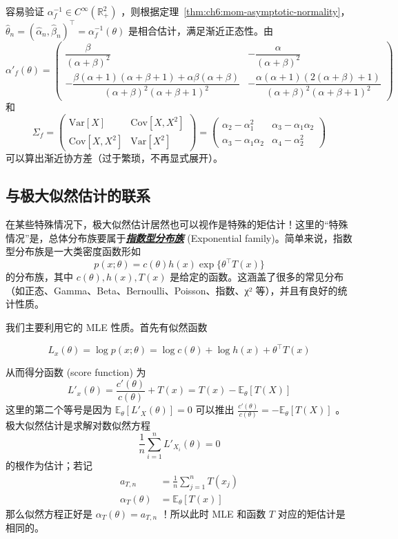 \begin{remark}
\begin{example}
容易验证 $\alpha_f^{-1}\in C^\infty(\mathbb R_+^2)$ ，则根据定理~\ref{thm:ch6:mom-asymptotic-normality}， $\widehat\theta_n=(\widehat\alpha_n,\widehat\beta_n)^\top=\alpha_f^{-1}(\theta)$ 是相合估计，满足渐近正态性。由\[\alpha'_f(\theta)=\begin{pmatrix} \dfrac{\beta}{(\alpha+\beta)^2} & -\dfrac{\alpha}{(\alpha+\beta)^2} \\ -\dfrac{\beta(\alpha+1)(\alpha+\beta+1) + \alpha\beta (\alpha+\beta)}{(\alpha+\beta)^2(\alpha+\beta+1)^2} & -\dfrac{\alpha(\alpha+1)(2(\alpha+\beta)+1)}{(\alpha+\beta)^2(\alpha+\beta+1)^2} \end{pmatrix}\]和\[\Sigma_f = \begin{pmatrix} \mathrm{Var}[X] & \mathrm{Cov}[X, X^2] \\ \mathrm{Cov}[X, X^2] & \mathrm{Var}[X^2] \end{pmatrix}= \begin{pmatrix} \alpha_2 - \alpha_1^2 & \alpha_3 - \alpha_1\alpha_2 \\ \alpha_3 - \alpha_1\alpha_2 & \alpha_4 - \alpha_2^2 \end{pmatrix}\]
可以算出渐近协方差（过于繁琐，不再显式展开）。


\end{example}

\subsection{与极大似然估计的联系}

在某些特殊情况下，极大似然估计居然也可以视作是特殊的矩估计！这里的``特殊情况''是，总体分布族要属于\textbf{\emph{\href{https://en.wikipedia.org/wiki/Exponential_family}{指数型分布族}}} (Exponential family)。简单来说，指数型分布族是一大类密度函数形如
\[
p(x;\theta)=c(\theta)h(x)\exp\{\theta^\top T(x)\}
\]
的分布族，其中 $c(\theta),h(x),T(x)$ 是给定的函数。这涵盖了很多的常见分布（如正态、Gamma、Beta、Bernoulli、Poisson、指数、χ² 等），并且有良好的统计性质。%



我们主要利用它的 MLE 性质。首先有似然函数 

$$L_x(\theta)=\log p(x;\theta)=\log c(\theta)+\log h(x)+\theta^\top T(x)$$

从而得分函数 (score function) 为 \[ L'_x(\theta)=\frac{c'(\theta)}{c(\theta)}+T(x)=T(x)-\mathbb{E}_\theta[T(X)] \]这里的第二个等号是因为 $\mathbb{E}_\theta[L'_X(\theta)]=0$ 可以推出 $\frac{c'(\theta)}{c(\theta)}=-\mathbb{E}_\theta[T(X)]$ 。极大似然估计是求解对数似然方程 \[ \frac{1}{n}\sum_{i=1}^n L'_{X_i}(\theta) = 0 \]的根作为估计；若记
\[\begin{aligned} a_{T,n}&=\frac1n\sum_{j=1}^nT(x_j)\\ \alpha_T(\theta)&=\mathbb{E}_\theta[T(x)] \end{aligned}\]
那么似然方程正好是 $\alpha_{T}(\theta)=a_{T,n}$ ！所以此时 MLE 和函数 $T$ 对应的矩估计是相同的。


\end{remark}
